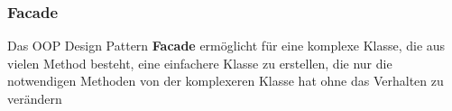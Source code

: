 \subsubsection{Facade}
Das OOP Design Pattern \textbf{Facade} ermöglicht für eine komplexe Klasse, die aus vielen Method besteht, eine einfachere Klasse zu erstellen, 
die nur die notwendigen Methoden von der komplexeren Klasse hat ohne das Verhalten zu verändern